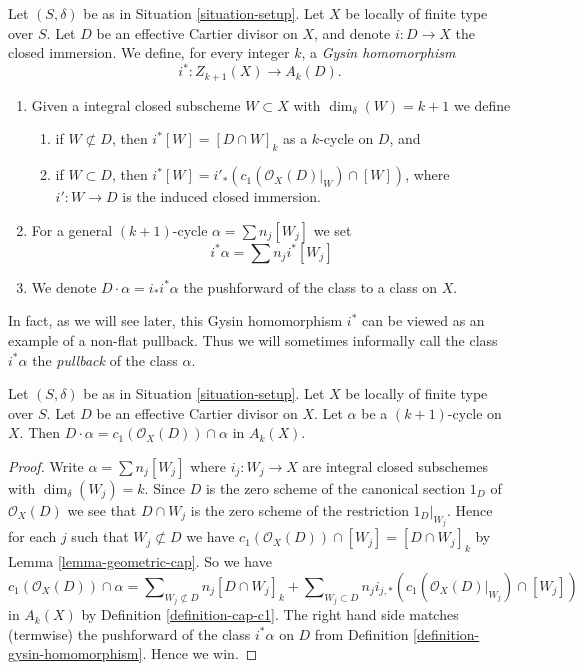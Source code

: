\begin{definition}
\label{definition-gysin-homomorphism}
Let $(S, \delta)$ be as in Situation \ref{situation-setup}.
Let $X$ be locally of finite type over $S$.
Let $D$ be an effective Cartier divisor on $X$, and
denote $i : D \to X$ the closed immersion.
We define, for every integer $k$, a
{\it Gysin homomorphism}
$$
i^* : Z_{k + 1}(X) \to A_k(D).
$$
\begin{enumerate}
\item Given a integral closed subscheme $W \subset X$ with
$\dim_\delta(W) = k + 1$ we define
\begin{enumerate}
\item if $W \not \subset D$, then $i^*[W] = [D \cap W]_k$ as a
$k$-cycle on $D$, and
\item if $W \subset D$, then
$i^*[W] = i'_*(c_1(\mathcal{O}_X(D)|_W) \cap [W])$,
where $i' : W \to D$ is the induced closed immersion.
\end{enumerate}
\item For a general $(k + 1)$-cycle $\alpha = \sum n_j[W_j]$
we set
$$
i^*\alpha = \sum n_j i^*[W_j]
$$
\item We denote $D \cdot \alpha = i_*i^*\alpha$ the pushforward of
the class to a class on $X$.
\end{enumerate}
\end{definition}

\noindent
In fact, as we will see later, this Gysin homomorphism $i^*$ can be viewed
as an example of a non-flat pullback. Thus we will sometimes informally
call the class $i^*\alpha$ the {\it pullback} of the class $\alpha$.

\begin{lemma}
\label{lemma-support-cap-effective-Cartier}
Let $(S, \delta)$ be as in Situation \ref{situation-setup}.
Let $X$ be locally of finite type over $S$.
Let $D$ be an effective Cartier divisor on $X$.
Let $\alpha$ be a $(k + 1)$-cycle on $X$.
Then $D \cdot \alpha = c_1(\mathcal{O}_X(D)) \cap \alpha$
in $A_k(X)$.
\end{lemma}

\begin{proof}
Write $\alpha = \sum n_j[W_j]$ where $i_j : W_j \to X$ are integral closed
subschemes with $\dim_\delta(W_j) = k$.
Since $D$ is the zero scheme of the canonical section $1_D$ of
$\mathcal{O}_X(D)$ we see that $D \cap W_j$ is the zero scheme
of the restriction $1_D|_{W_j}$. Hence for each $j$ such that
$W_j \not \subset D$ we have
$c_1(\mathcal{O}_X(D)) \cap [W_j] = [D \cap W_j]_k$
by Lemma \ref{lemma-geometric-cap}. So we have
$$
c_1(\mathcal{O}_X(D)) \cap \alpha
=
\sum\nolimits_{W_j \not \subset D} n_j[D \cap W_j]_k
+
\sum\nolimits_{W_j \subset D}
n_j i_{j, *}(c_1(\mathcal{O}_X(D)|_{W_j}) \cap [W_j])
$$
in $A_k(X)$ by Definition \ref{definition-cap-c1}.
The right hand side matches (termwise) the pushforward of the class
$i^*\alpha$ on $D$ from Definition \ref{definition-gysin-homomorphism}.
Hence we win.
\end{proof}

